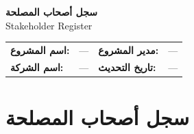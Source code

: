 \documentclass[11pt,a4paper]{article}
\begin{document}
\begin{center}
{\LARGE\bfseries سجل أصحاب المصلحة}\\[0.3em]
{\large Stakeholder Register}\\[1em]
\end{center}

\begin{table}[H]
\centering
\renewcommand{\arraystretch}{1.4}
\begin{tabularx}{\textwidth}{L{3.5cm} X L{3.5cm} X}
\toprule
\textbf{اسم المشروع:} & --- & \textbf{مدير المشروع:} & --- \\
\textbf{اسم الشركة:} & --- & \textbf{تاريخ التحديث:} & --- \\
\bottomrule
\end{tabularx}
\end{table}

\vspace{1em}

\section{سجل أصحاب المصلحة}
\label{sec:register}
\end{document}
